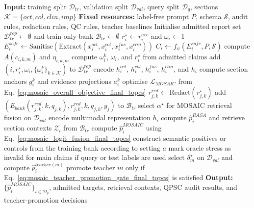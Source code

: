 \begin{algorithm}[!t]
\scriptsize
\caption{MOSAIC training, retrieval, and gated semantic audits}
\label{alg:mosaic_workflow_final_topcs}
\begin{algorithmic}[1]
\State \textbf{Input:} training split $\mathcal{D}_{tr}$, validation split $\mathcal{D}_{val}$, query split $\mathcal{D}_{q}$, sections $\mathcal{K}=\{oct,col,clin,imp\}$
\State \textbf{Fixed resources:} label-free prompt $P$, schema $\mathcal{S}$, audit rules, redaction rules, QC rules, teacher baselines
\State Initialise admitted report set $\mathcal{D}_{tr}^{rep}\leftarrow\emptyset$ and train-only bank $\mathcal{B}_{tr}\leftarrow\emptyset$
        \State $r_i^{\star}\leftarrow r_i^{arc}$ and $\omega_i\leftarrow 1$
    \Else
        \State $E_i^{safe}\leftarrow\mathrm{Sanitise}(\mathrm{Extract}(x_i^{oct},x_i^{col},x_i^{fus},x_i^{clin}))$
        \State $C_i\leftarrow f_{\psi}(E_i^{safe},P,\mathcal{S})$
            \State compute $A(c_{i,k,m})$ and $\eta_{i,k,m}$
        \EndFor
        \State compute $\omega_i^k$, $\omega_i$, and $r_i^{\star}$ from admitted claims
    \EndIf
        \State add $(i,r_i^{\star},\omega_i,\{\omega_i^k\}_{k\in\mathcal{K}})$ to $\mathcal{D}_{tr}^{rep}$
    \EndIf
\EndFor
{}
    \State encode $h_i^{oct}$, $h_i^{col}$, $h_i^{fus}$, $h_i^{clin}$, and $h_i$
    \State compute section anchors $g_i^k$ and evidence projections $a_i^k$
    \State optimise $\mathcal{L}_{MOSAIC}$ from Eq.~\eqref{eq:mosaic_overall_objective_final_topcs}
\EndFor
{}
    \State $r_{j,k}^{red}\leftarrow\mathrm{Redact}(r_{j,k}^{\star})$
    \State add $(E_{bank}(r_{j,k}^{red},k,q_{j,k}),r_{j,k}^{red},k,q_{j,k},y_j)$ to $\mathcal{B}_{tr}$
\EndFor
\State select $\alpha^{\star}$ for MOSAIC retrieval fusion on $\mathcal{D}_{val}$
    \State encode multimodal representation $h_i$
    \State compute $\hat p_i^{RASA}$ and retrieve section contexts $\mathcal{Z}_i$ from $\mathcal{B}_{tr}$
    \State compute $\hat p_i^{MOSAIC}$ using Eq.~\eqref{eq:mosaic_logit_fusion_final_topcs}
\EndFor
{}
    \State construct semantic positives or controls from the training bank according to setting $a$
    \State mark oracle stress as invalid for main claims if query or test labels are used
\EndFor
{}
    \State select $\delta_m^{\star}$ on $\mathcal{D}_{val}$ and compute $\hat p_i^{teacher(m)}$
    \State promote teacher $m$ only if Eq.~\eqref{eq:mosaic_teacher_promotion_gate_final_topcs} is satisfied
\EndFor
\State \textbf{Output:} $\{\hat p_i^{MOSAIC}\}_{i\in\mathcal{D}_{q}}$, admitted targets, retrieval contexts, QPSC audit results, and teacher-promotion decisions
\end{algorithmic}
\end{algorithm}

